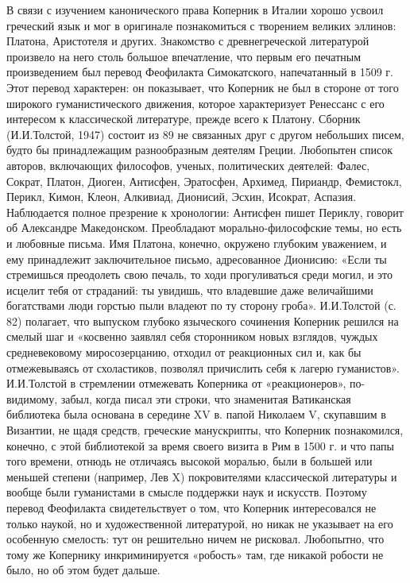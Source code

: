 В связи с изучением канонического права Коперник в Италии хорошо
усвоил греческий язык и мог в оригинале познакомиться с творением
великих эллинов: Платона, Аристотеля и других. Знакомство с
древнегреческой литературой произвело на него столь большое
впечатление, что первым его печатным произведением был перевод
Феофилакта Симокатского, напечатанный в 1509 г. Этот перевод
характерен: он показывает, что Коперник не был в стороне от того
широкого гуманистического движения, которое характеризует Ренессанс с
его интересом к классической литературе, прежде всего к Платону.
Сборник (И.И.Толстой, 1947) состоит из 89 не связанных друг с другом
небольших писем, будто бы принадлежащим разнообразным деятелям Греции.
Любопытен список авторов, включающих философов, ученых, политических
деятелей: Фалес, Сократ, Платон, Диоген, Антисфен, Эратосфен, Архимед,
Пириандр, Фемистокл, Перикл, Кимон, Клеон, Алкивиад, Дионисий, Эсхин,
Исократ, Аспазия. Наблюдается полное презрение к хронологии: Антисфен
пишет Периклу, говорит об Александре Македонском. Преобладают
морально-философские темы, но есть и любовные письма. Имя Платона,
конечно, окружено глубоким уважением, и ему принадлежит заключительное
письмо, адресованное Дионисию: «Если ты стремишься преодолеть свою
печаль, то ходи прогуливаться среди могил, и это исцелит тебя от
страданий: ты увидишь, что владевшие даже величайшими богатствами люди
горстью пыли владеют по ту сторону гроба». И.И.Толстой (с. 82)
полагает, что выпуском глубоко языческого сочинения Коперник решился
на смелый шаг и «косвенно заявлял себя сторонником новых взглядов,
чуждых средневековому миросозерцанию, отходил от реакционных сил и,
как бы отмежевываясь от схоластиков, позволял причислить себя к лагерю
гуманистов». И.И.Толстой в стремлении отмежевать Коперника от
«реакционеров», по-видимому, забыл, когда писал эти строки, что
знаменитая Ватиканская библиотека была основана в середине XV в. папой
Николаем V, скупавшим в Византии, не щадя средств, греческие
манускрипты, что Коперник познакомился, конечно, с этой библиотекой за
время своего визита в Рим в 1500 г. и что папы того времени, отнюдь не
отличаясь высокой моралью, были в большей или меньшей степени
(например, Лев X) покровителями классической литературы и вообще были
гуманистами в смысле поддержки наук и искусств. Поэтому перевод
Феофилакта свидетельствует о том, что Коперник интересовался не только
наукой, но и художественной литературой, но никак не указывает на его
особенную смелость: тут он решительно ничем не рисковал. Любопытно,
что тому же Копернику инкриминируется «робость» там, где никакой
робости не было, но об этом будет дальше.

